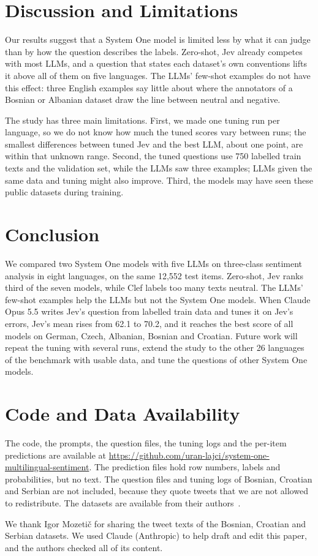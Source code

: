 \documentclass[sigconf]{acmart}
\begin{document}
\section{Discussion and Limitations}
Our results suggest that a System One model is limited less by what it can judge than by how the question describes the labels. Zero-shot, Jev already competes with most LLMs, and a question that states each dataset's own conventions lifts it above all of them on five languages. The LLMs' few-shot examples do not have this effect: three English examples say little about where the annotators of a Bosnian or Albanian dataset draw the line between neutral and negative.

The study has three main limitations. First, we made one tuning run per language, so we do not know how much the tuned scores vary between runs; the smallest differences between tuned Jev and the best LLM, about one point, are within that unknown range. Second, the tuned questions use 750 labelled train texts and the validation set, while the LLMs saw three examples; LLMs given the same data and tuning might also improve. Third, the models may have seen these public datasets during training.

\section{Conclusion}
We compared two System One models with five LLMs on three-class sentiment analysis in eight languages, on the same 12,552 test items. Zero-shot, Jev ranks third of the seven models, while Clef labels too many texts neutral. The LLMs' few-shot examples help the LLMs but not the System One models. When Claude Opus 5.5 writes Jev's question from labelled train data and tunes it on Jev's errors, Jev's mean rises from 62.1 to 70.2, and it reaches the best score of all models on German, Czech, Albanian, Bosnian and Croatian. Future work will repeat the tuning with several runs, extend the study to the other 26 languages of the benchmark with usable data, and tune the questions of other System One models.

\section{Code and Data Availability}
The code, the prompts, the question files, the tuning logs and the per-item predictions are available at \url{https://github.com/uran-lajci/system-one-multilingual-sentiment}. The prediction files hold row numbers, labels and probabilities, but no text. The question files and tuning logs of Bosnian, Croatian and Serbian are not included, because they quote tweets that we are not allowed to redistribute. The datasets are available from their authors~\cite{barbieri2022xlmt,kastrati2021albana,mozetic2016multilingual,habernal2013czech}.

\begin{acks}
We thank Igor Mozeti\v{c} for sharing the tweet texts of the Bosnian, Croatian and Serbian datasets. We used Claude (Anthropic) to help draft and edit this paper, and the authors checked all of its content.
\end{acks}



\end{document}
